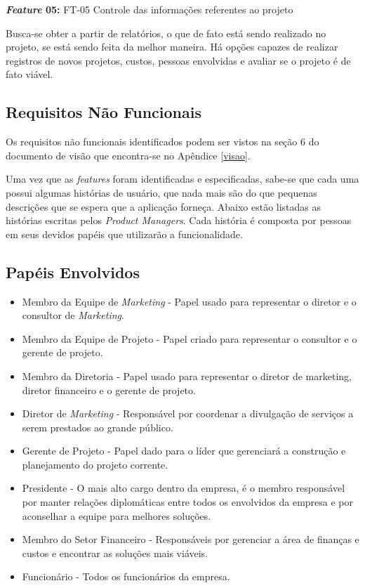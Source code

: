 \textbf{\textit{Feature} 05:} FT-05 Controle das informações referentes ao projeto

Busca-se obter a partir de relatórios, o que de fato está sendo realizado no projeto, se está sendo feita da melhor maneira. Há opções capazes de realizar registros de novos projetos, custos, pessoas envolvidas e avaliar se o projeto é de fato viável.

\subsection{Requisitos Não Funcionais}
Os requisitos não funcionais identificados podem ser vistos na seção 6 do documento de visão que encontra-se no Apêndice \ref{visao}.

Uma vez que as \textit{features} foram identificadas e especificadas, sabe-se que cada uma possui algumas histórias de usuário, que nada mais são do que pequenas descrições que se espera que a aplicação forneça. Abaixo estão listadas as histórias escritas pelos \textit{Product Managers}. Cada história é composta por pessoas em seus devidos papéis que utilizarão a funcionalidade.

\subsection{Papéis Envolvidos}\begin{itemize}
\item Membro da Equipe de \textit{Marketing} - Papel usado para representar o diretor e o consultor de \textit{Marketing}.

\item Membro da Equipe de Projeto - Papel criado para representar o consultor e o gerente de projeto.

\item Membro da Diretoria - Papel usado para representar o diretor de marketing, diretor financeiro e o gerente de projeto.

\item Diretor de \textit{Marketing} - Responsável por coordenar a divulgação de serviços a serem prestados ao grande público.

\item Gerente de Projeto - Papel dado para o líder que gerenciará a construção e planejamento do projeto corrente.

\item Presidente - O mais alto cargo dentro da empresa, é o membro responsável por manter relações diplomáticas entre todos os envolvidos da empresa e por aconselhar a equipe para melhores soluções.

\item Membro do Setor Financeiro - Responsáveis por gerenciar a área de finanças e custos e encontrar as soluções mais viáveis. 

\item Funcionário - Todos os funcionários da empresa.
\end{itemize}

